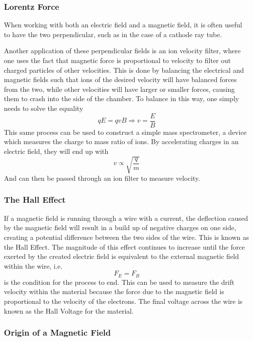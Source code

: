 \documentclass[12pt]{report}
\begin{document}
\begin{flushleft}
\subsubsection*{Lorentz Force}

When working with both an electric field and a magnetic field, it is often
useful to have the two perpendicular, such as in the case of a cathode ray
tube. \par
Another application of these perpendicular fields is an ion velocity filter,
where one uses the fact that magnetic force is proportional to velocity to
filter out charged particles of other velocities. This is done by balancing the
electrical and magnetic fields such that ions of the desired velocity will have
balanced forces from the two, while other velocities will have larger or
smaller forces, causing them to crash into the side of the chamber. To balance
in this way, one simply needs to solve the equality
\[qE = qvB \Rightarrow v = \frac{E}{B}\]
This same process can be used to construct a simple mass spectrometer, a device
which measures the charge to mass ratio of ions. By accelerating charges in an
electric field, they will end up with
\[v \propto \sqrt{\frac{q}{m}}\]
And can then be passed through an ion filter to measure velocity.

\subsubsection*{The Hall Effect}

If a magnetic field is running through a wire with a current, the deflection
caused by the magnetic field will result in a build up of negative charges on
one side, creating a potential difference between the two sides of the wire.
This is known as the Hall Effect. The magnitude of this effect continues to
increase until the force exerted by the created electric field is equivalent to
the external magnetic field within the wire, i.e.
\[F_E = F_B\]
is the condition for the process to end. This can be used to measure the drift
velocity within the material because the force due to the magnetic field is
proportional to the velocity of the electrons. The final voltage across the
wire is known as the Hall Voltage for the material.

\subsubsection*{Origin of a Magnetic Field}


\end{flushleft}
\end{document}
